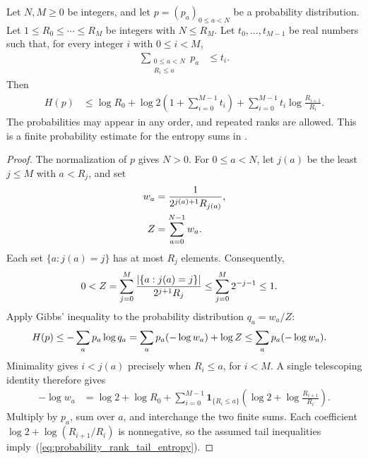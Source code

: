 \begin{theorem}
    \label{thm:probability_entropy_rank_tails}
    \leanok
    Let $N,M\geq0$ be integers, and let $p=(p_a)_{0\leq a<N}$ be a
    probability distribution. Let $1\leq R_0\leq\cdots\leq R_M$ be integers
    with $N\leq R_M$. Let $t_0,\ldots,t_{M-1}$ be real numbers such that,
    for every integer $i$ with $0\leq i<M$,
    \begin{align}
        \sum_{\substack{0\leq a<N \\R_i\leq a}}p_a
         & \leq t_i.
        \label{eq:probability_rank_tail_input}
    \end{align}
    Then
    \begin{align}
        H(p)
         & \leq \log R_0
        +\log2\left(1+\sum_{i=0}^{M-1}t_i\right)
        +\sum_{i=0}^{M-1}t_i\log\frac{R_{i+1}}{R_i}.
        \label{eq:probability_rank_tail_entropy}
    \end{align}
    The probabilities may appear in any order, and repeated ranks are
    allowed. This is a finite probability estimate for the entropy sums in
    \cite{Arad2013AreaLaw,Hastings2007AreaLaw,Arad2016RigorousRG}.
\end{theorem}
\begin{proof}\leanok
    The normalization of $p$ gives $N>0$. For $0\leq a<N$, let $j(a)$ be
    the least $j\leq M$ with $a<R_j$, and set
    \begin{align}
        w_a & =\frac{1}{2^{j(a)+1}R_{j(a)}},
        \label{eq:probability_rank_tail_dyadic_weight} \\
        Z   & =\sum_{a=0}^{N-1}w_a.
        \notag
    \end{align}
    Each set $\{a:j(a)=j\}$ has at most $R_j$ elements. Consequently,
    \begin{align}
        0<Z
         & =\sum_{j=0}^{M}
        \frac{\lvert\{a:j(a)=j\}\rvert}{2^{j+1}R_j}
        \leq\sum_{j=0}^{M}2^{-j-1}\leq1.
        \notag
    \end{align}
    Apply Gibbs' inequality to the probability distribution $q_a=w_a/Z$:
    \begin{align}
        H(p)
         & \leq-\sum_a p_a\log q_a
        =\sum_a p_a(-\log w_a)+\log Z
        \leq\sum_a p_a(-\log w_a).
        \notag
    \end{align}
    Minimality gives $i<j(a)$ precisely when $R_i\leq a$, for $i<M$.
    A single telescoping identity therefore gives
    \begin{align}
        -\log w_a
         & =\log2+\log R_0
        +\sum_{i=0}^{M-1}\mathbf1_{\{R_i\leq a\}}
        \left(\log2+\log\frac{R_{i+1}}{R_i}\right).
        \label{eq:probability_rank_tail_cost}
    \end{align}
    Multiply by $p_a$, sum over $a$, and interchange the two finite sums.
    Each coefficient $\log2+\log(R_{i+1}/R_i)$ is nonnegative, so the
    assumed tail inequalities imply~(\ref{eq:probability_rank_tail_entropy}).
\end{proof}

